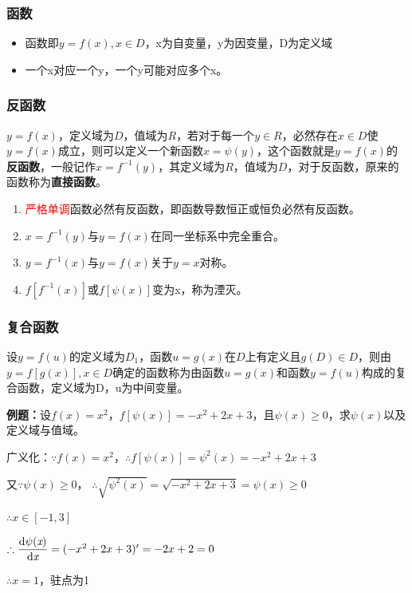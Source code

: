 \documentclass[UTF8, 12pt]{ctexart}
\begin{document}
    \subsubsection{函数}
    \begin{itemize}
        \item 函数即$y=f(x),x\in D$，x为自变量，y为因变量，D为定义域
        \item 一个x对应一个y，一个y可能对应多个x。
    \end{itemize}

    \subsubsection{反函数}
    $y=f(x)$，定义域为$D$，值域为$R$，若对于每一个$y\in R$，必然存在$x\in D$使$y=f(x)$成立，则可以定义一个新函数$x=\psi(y)$，这个函数就是$y=f(x)$的\textbf{反函数}，一般记作$x=f^{-1}(y)$，其定义域为$R$，值域为$D$，对于反函数，原来的函数称为\textbf{直接函数}。
    \begin{enumerate}
        \item \textcolor{red}{严格单调}函数必然有反函数，即函数导数恒正或恒负必然有反函数。
        \item $x=f^{-1}(y)$与$y=f(x)$在同一坐标系中完全重合。
        \item $y=f^{-1}(x)$与$y=f(x)$关于$y=x$对称。
        \item $f[f^{-1}(x)]$或$f[\psi(x)]$变为x，称为湮灭。
    \end{enumerate}

    \subsubsection{复合函数}
    设$y=f(u)$的定义域为$D_1$，函数$u=g(x)$在$D$上有定义且$g(D)\in D$，则由$y=f[g(x)],x\in D$确定的函数称为由函数$u=g(x)$和函数$y=f(u)$构成的复合函数，定义域为D，u为中间变量。

    \textbf{例题：}设$f(x)=x^2$，$f[\psi(x)]=-x^2+2x+3$，且$\psi(x)\geqslant 0$，求$\psi(x)$以及定义域与值域。

    广义化：$\because f(x)=x^2$，$\therefore f[\psi(x)]=\psi^2(x)=-x^2+2x+3$

    又$\because\psi(x)\geqslant 0$， $\therefore\sqrt{\psi^2(x)}=\sqrt{-x^2+2x+3}=\psi(x)\geqslant 0$

    $\therefore x\in[-1,3]$

    $\therefore\dfrac{\rm{d}\psi(\textit{x})}{\rm{d}\textit{x}}=(-x^2+2x+3)'=-2x+2=0$

    $\therefore x=1$，驻点为1
\end{document}
